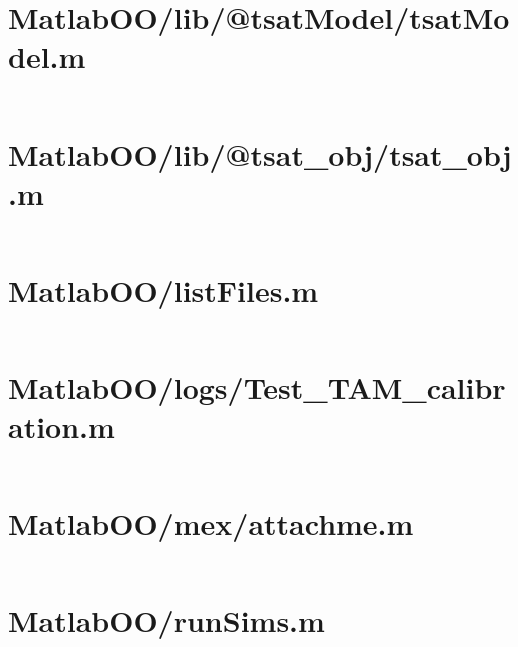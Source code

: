 \pagebreak
\section*{MatlabOO/lib/@tsatModel/tsatModel.m}\label{code:MatlabOO/lib/@tsatModel/tsatModel.m}
\inputminted[linenos,fontsize=\scriptsize]{matlab}{/home/dcouture/git/mathyourlife/TSatPy/beta_versions/matlab_object_oriented/lib/@tsatModel/tsatModel.m}

\pagebreak
\section*{MatlabOO/lib/@tsat\_obj/tsat\_obj.m}\label{code:MatlabOO/lib/@tsat_obj/tsat_obj.m}
\inputminted[linenos,fontsize=\scriptsize]{matlab}{/home/dcouture/git/mathyourlife/TSatPy/beta_versions/matlab_object_oriented/lib/@tsat_obj/tsat_obj.m}

\pagebreak
\section*{MatlabOO/listFiles.m}\label{code:MatlabOO/listFiles.m}
\inputminted[linenos,fontsize=\scriptsize]{matlab}{/home/dcouture/git/mathyourlife/TSatPy/beta_versions/matlab_object_oriented/listFiles.m}

\pagebreak
\section*{MatlabOO/logs/Test\_TAM\_calibration.m}\label{code:MatlabOO/logs/Test_TAM_calibration.m}
\inputminted[linenos,fontsize=\scriptsize]{matlab}{/home/dcouture/git/mathyourlife/TSatPy/beta_versions/matlab_object_oriented/logs/Test_TAM_calibration.m}

\pagebreak
\section*{MatlabOO/mex/attachme.m}\label{code:MatlabOO/mex/attachme.m}
\inputminted[linenos,fontsize=\scriptsize]{matlab}{/home/dcouture/git/mathyourlife/TSatPy/beta_versions/matlab_object_oriented/mex/attachme.m}

\pagebreak
\section*{MatlabOO/runSims.m}\label{code:MatlabOO/runSims.m}
\inputminted[linenos,fontsize=\scriptsize]{matlab}{/home/dcouture/git/mathyourlife/TSatPy/beta_versions/matlab_object_oriented/runSims.m}


